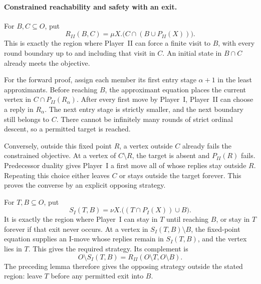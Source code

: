 \paragraph{Constrained reachability and safety with an exit.}
For \(B,C\subseteq O\),
put
\[
 R_{II}(B,C)=
   \mu X.\bigl(C\cap(B\cup P_{II}(X))\bigr).
\]
This is exactly the
region where Player~II
can force a finite
visit to \(B\), with
every round boundary
up to and including
that visit in \(C\).
An initial state in
\(B\cap C\) already
meets the objective.

For the forward proof,
assign each member its
first entry stage
\(\alpha+1\) in the
least approximants.
Before reaching \(B\),
the approximant equation
places the current vertex
in \(C\cap P_{II}(R_\alpha)\).
After every first move
by Player~I, Player~II
can choose a reply in
\(R_\alpha\).
The next entry stage
is strictly smaller,
and the next boundary
still belongs to \(C\).
There cannot be infinitely
many rounds of strict
ordinal descent, so a
permitted target is
reached.

Conversely, outside this
fixed point \(R\), a
vertex outside \(C\)
already fails the constrained
objective. At a vertex
of \(C\setminus R\),
the target is absent
and \(P_{II}(R)\) fails.
Predecessor duality gives
Player~I a first move
all of whose replies
stay outside \(R\).
Repeating this choice
either leaves \(C\)
or stays outside the
target forever.
This proves the converse
by an explicit opposing
strategy.

For \(T,B\subseteq O\),
put
\[
 S_I(T,B)=
   \nu X.\bigl((T\cap P_I(X))\cup B\bigr).
\]
It is exactly the
region where Player~I
can stay in \(T\)
until reaching \(B\),
or stay in \(T\)
forever if that exit
never occurs.
At a vertex in
\(S_I(T,B)\setminus B\),
the fixed-point equation
supplies an I-move
whose replies remain
in \(S_I(T,B)\), and
the vertex lies in
\(T\). This gives
the required strategy.
Its complement is
\[
 O\setminus S_I(T,B)
   =R_{II}(O\setminus T,O\setminus B).
\]
The preceding lemma
therefore gives the
opposing strategy outside
the stated region:
leave \(T\) before
any permitted exit
into \(B\).

